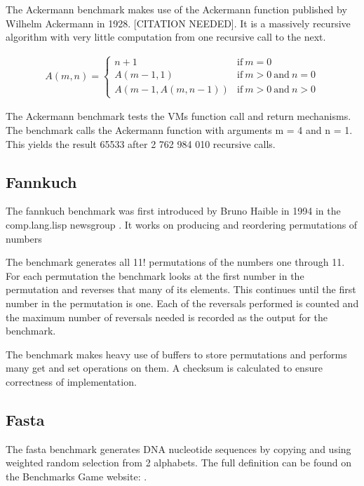 \documentclass[english,a4paper]{report}
\begin{document}
The Ackermann benchmark makes use of the Ackermann function published
by Wilhelm Ackermann in 1928. [CITATION NEEDED]. It is a massively
recursive algorithm with very little computation from one recursive
call to the next.

\begin{align*}
\label{eq:ackermann}
A (m, n) = \left\{
\begin{array}{ll}
n + 1          &  \mathrm{if}\ m = 0 \\
A (m - 1, 1)   &  \mathrm{if }\ m > 0 \mathrm{\ and\ } n = 0 \\
A (m - 1, A (m, n - 1))   & \mathrm{if}\ m > 0 \mathrm{\  and\  } n > 0 
\end{array}
\right.
\end{align*}


The Ackermann benchmark tests the VMs function call and return
mechanisms. The benchmark calls the Ackermann function with arguments
m = 4 and n = 1. This yields the result 65533 after 2 762 984 010
recursive calls.

\subsection{Fannkuch}

The fannkuch benchmark was first introduced by Bruno Haible in 1994 in
the comp.lang.lisp newsgroup \cite{fannkuch}. It works on producing
and reordering permutations of numbers

The benchmark generates all 11! permutations of the numbers one
through 11. For each permutation the benchmark looks at the first
number in the permutation and reverses that many of its elements. This
continues until the first number in the permutation is one. Each of
the reversals performed is counted and the maximum number of reversals
needed is recorded as the output for the benchmark.

The benchmark makes heavy use of buffers to store permutations and
performs many get and set operations on them. A checksum is calculated
to ensure correctness of implementation.

\subsection{Fasta}
The fasta benchmark generates DNA nucleotide sequences by copying and
using weighted random selection from 2 alphabets. The full definition
can be found on the Benchmarks Game website: \cite{fasta}.
\end{document}
